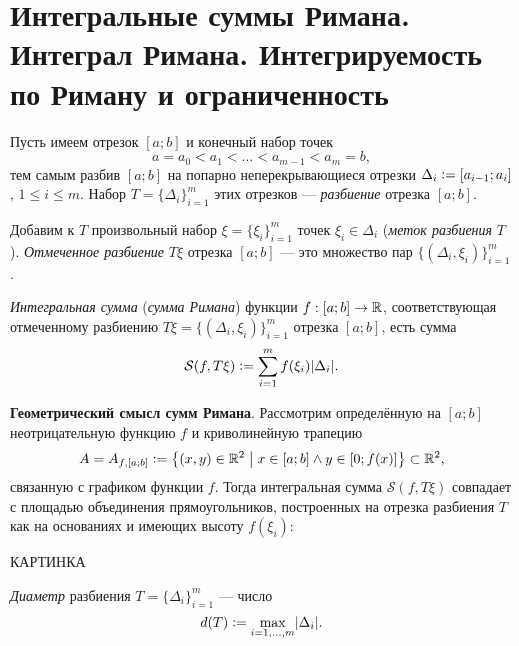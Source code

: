 \section{Интегральные суммы Римана. Интеграл Римана. Интегрируемость по Риману и ограниченность}

\begin{definition}
    Пусть имеем отрезок $[a; b]$ и конечный набор точек
    \[
        a = a_0 < a_1 < \ldots < a_{m - 1} < a_m = b,
    \]
    тем самым разбив $[a; b]$ на попарно неперекрывающиеся отрезки $\Delta_i \vcentcolon = [a_{i - 1}; a_i]$, $1 \leqslant i \leqslant m$. Набор $T = \{\Delta_i\}_{i = 1}^m$ этих отрезков --- \textit{разбиение} отрезка $[a; b]$.
\end{definition}

\begin{definition}
    Добавим к $T$ произвольный набор $\xi = \{\xi_i\}_{i = 1}^m$ точек $\xi_i \in \Delta_i$ (\textit{меток разбиения} $T$). \textit{Отмеченное разбиение} $T\xi$ отрезка $[a; b]$ --- это множество пар $\{(\Delta_i, \xi_i)\}_{i = 1}^m$.
\end{definition}

\begin{definition}
    \textit{Интегральная сумма} (\textit{сумма Римана}) функции $f: [a; b] \to \mathbb{R}$, соответствующая отмеченному разбиению $T\xi = \{(\Delta_i, \xi_i)\}_{i = 1}^m$ отрезка $[a; b]$, есть сумма
    \[
        \mathcal{S}(f, T\xi) \vcentcolon = \sum_{i = 1}^mf(\xi_i)|\Delta_i|.
    \]
\end{definition}

\textbf{Геометрический смысл сумм Римана}. Рассмотрим определённую на $[a; b]$ неотрицательную функцию $f$ и криволинейную трапецию
\[
    A = A_{f, [a; b]} \vcentcolon = \left\{(x, y) \in \mathbb{R}^2\;\middle\vert\; x \in [a; b] \wedge y \in [0; f(x)]\right\} \subset \mathbb{R}^2,
\]
связанную с графиком функции $f$. Тогда интегральная сумма $\mathcal{S}(f, T\xi)$ совпадает с площадью объединения прямоугольников, построенных на отрезка разбиения $T$ как на основаниях и имеющих высоту $f(\xi_i)$:

\begin{center}
    \Large\scshape КАРТИНКА
\end{center}

\begin{definition}
    \textit{Диаметр} разбиения $T = \{\Delta_i\}_{i = 1}^m$ --- число
    \[
        d(T) \vcentcolon = \underset{i = 1, \ldots, m}{\max}|\Delta_i|.
    \]
\end{definition}

